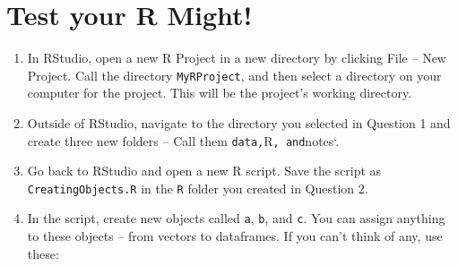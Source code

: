 \documentclass[]{book}
\newenvironment{Shaded}{\begin{snugshade}}{\end{snugshade}}
\newcommand{\KeywordTok}[1]{\textcolor[rgb]{0.13,0.29,0.53}{\textbf{{#1}}}}
\newcommand{\DecValTok}[1]{\textcolor[rgb]{0.00,0.00,0.81}{{#1}}}
\newcommand{\StringTok}[1]{\textcolor[rgb]{0.31,0.60,0.02}{{#1}}}
\newcommand{\NormalTok}[1]{{#1}}
\theoremstyle{definition}
\theoremstyle{definition}
\theoremstyle{remark}
\begin{document}
\section{Test your R Might!}\label{test-your-r-might-3}

\begin{enumerate}
\def\labelenumi{\arabic{enumi}.}
\item
  In RStudio, open a new R Project in a new directory by clicking File
  -- New Project. Call the directory \texttt{MyRProject}, and then
  select a directory on your computer for the project. This will be the
  project's working directory.
\item
  Outside of RStudio, navigate to the directory you selected in Question
  1 and create three new folders -- Call them
  \texttt{data,}R\texttt{,\ and}notes`.
\item
  Go back to RStudio and open a new R script. Save the script as
  \texttt{CreatingObjects.R} in the \texttt{R} folder you created in
  Question 2.
\item
  In the script, create new objects called \texttt{a}, \texttt{b}, and
  \texttt{c}. You can assign anything to these objects -- from vectors
  to dataframes. If you can't think of any, use these:
\end{enumerate}

\begin{Shaded}
\end{Shaded}
\end{document}
